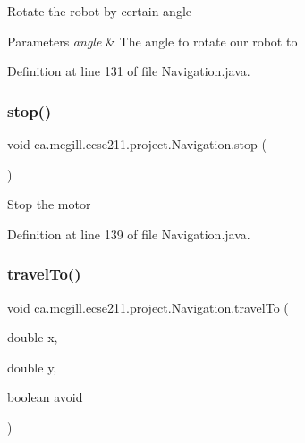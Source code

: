 Rotate the robot by certain angle


\begin{DoxyParams}{Parameters}
{\em angle} & The angle to rotate our robot to \\
\hline
\end{DoxyParams}


Definition at line 131 of file Navigation.\+java.

\mbox{\label{classca_1_1mcgill_1_1ecse211_1_1project_1_1_navigation_ae8530d181ffd790ff9dea5eeab54b1a1}} 
\subsubsection{\texorpdfstring{stop()}{stop()}}
{\footnotesize\ttfamily void ca.\+mcgill.\+ecse211.\+project.\+Navigation.\+stop (\begin{DoxyParamCaption}{ }\end{DoxyParamCaption})}

Stop the motor 

Definition at line 139 of file Navigation.\+java.

\mbox{\label{classca_1_1mcgill_1_1ecse211_1_1project_1_1_navigation_ada8a324c1d391698164476d4d728f0c4}} 
\subsubsection{\texorpdfstring{travel\+To()}{travelTo()}}
{\footnotesize\ttfamily void ca.\+mcgill.\+ecse211.\+project.\+Navigation.\+travel\+To (\begin{DoxyParamCaption}\item[{double}]{x,  }\item[{double}]{y,  }\item[{boolean}]{avoid }\end{DoxyParamCaption})}

